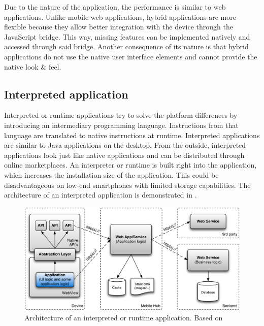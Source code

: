 Due to the nature of the application, the performance is similar to web applications. Unlike mobile web applications, hybrid applications are more flexible because they allow better integration with the device through the JavaScript bridge. This way, missing features can be implemented natively and accessed through said bridge. Another consequence of its nature is that hybrid applications do not use the native user interface elements and cannot provide the native look \& feel. 


\subsection{Interpreted application}

Interpreted or runtime applications try to solve the platform differences by introducing an intermediary programming language. Instructions from that language are translated to native instructions at runtime. Interpreted applications are similar to Java applications on the desktop. From the outside, interpreted applications look just like native applications and can be distributed through online marketplaces. An interpreter or runtime is built right into the application, which increases the installation size of the application. This could be disadvantageous on low-end smartphones with limited storage capabilities. The architecture of an interpreted application is demonstrated in .

\begin{figure}[h]
    \begin{center}
        \includegraphics[width=\textwidth]{../resources/figs/interpreted.pdf}
        \caption{Architecture of an interpreted or runtime application. Based on \cite{Friese}}
        \label{fig:interpreted}
    \end{center}
\end{figure}

